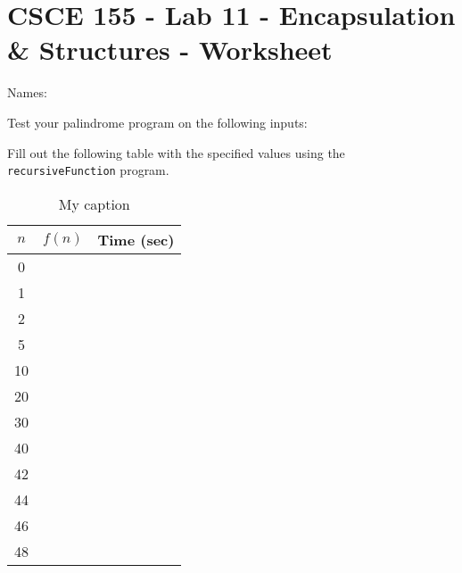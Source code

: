 \documentclass[10pt]{exam}
\begin{document}
\section*{CSCE 155 - Lab 11 - Encapsulation \& Structures - Worksheet}

Names: \underline{\hspace{10cm}}

\begin{questions}

\question Test your palindrome program on the following inputs:

\question Fill out the following table with the specified values using the \texttt{recursiveFunction} program.

\begin{table}[h]
\centering
\caption{My caption}
\label{my-label}
{\renewcommand{\arraystretch}{1.35}
\begin{tabular}{|c|p{4cm}|p{4cm}|}
\hline
$n$ & $f(n)$ & Time (sec) \\
\hline\hline
0   &        &            \\
\hline
1   &        &            \\
\hline
2   &        &            \\
\hline
5   &        &            \\
\hline
10  &        &            \\
\hline
20  &        &            \\
\hline
30  &        &            \\
\hline
40  &        &            \\
\hline
42  &        &            \\
\hline
44  &        &            \\
\hline
46  &        &            \\
\hline
48  &        &           \\
\hline
\end{tabular}
}
\end{table}


\end{questions}
\end{document}

